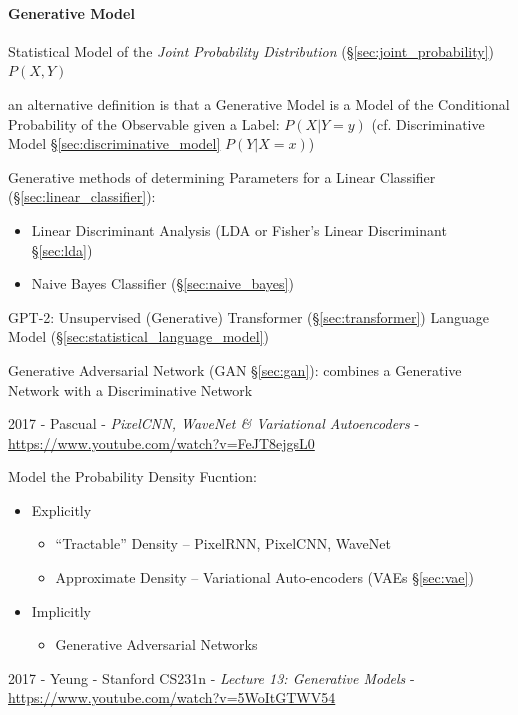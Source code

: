 \paragraph{Generative Model}\label{sec:generative_model}\hfill

Statistical Model of the \emph{Joint Probability Distribution}
(\S\ref{sec:joint_probability}) $P(X,Y)$

an alternative definition is that a Generative Model is a Model of the
Conditional Probability of the Observable given a Label: $P(X|Y = y)$
(cf. Discriminative Model \S\ref{sec:discriminative_model} $P(Y|X = x)$)

Generative methods of determining Parameters for a Linear Classifier
(\S\ref{sec:linear_classifier}):
\begin{itemize}
  \item Linear Discriminant Analysis (LDA or Fisher's Linear Discriminant
    \S\ref{sec:lda})
  \item Naive Bayes Classifier (\S\ref{sec:naive_bayes})
\end{itemize}

GPT-2: Unsupervised (Generative) Transformer (\S\ref{sec:transformer}) Language
Model (\S\ref{sec:statistical_language_model})

\fist Generative Adversarial Network (GAN \S\ref{sec:gan}): combines a
Generative Network with a Discriminative Network

2017 - Pascual - \emph{PixelCNN, WaveNet \& Variational Autoencoders} -
\url{https://www.youtube.com/watch?v=FeJT8ejgsL0}

Model the Probability Density Fucntion:
\begin{itemize}
  \item Explicitly
    \begin{itemize}
      \item ``Tractable'' Density -- PixelRNN, PixelCNN, WaveNet
      \item Approximate Density -- Variational Auto-encoders (VAEs
        \S\ref{sec:vae})
    \end{itemize}
  \item Implicitly
    \begin{itemize}
      \item Generative Adversarial Networks
    \end{itemize}
\end{itemize}

2017 - Yeung - Stanford CS231n - \emph{Lecture 13: Generative Models} -
\url{https://www.youtube.com/watch?v=5WoItGTWV54}

